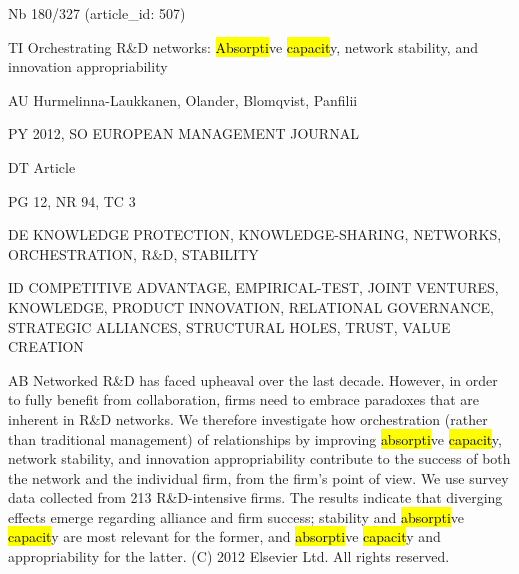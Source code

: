 \documentclass[a4paper]{article}
\begin{document}
\vspace*{-2cm}
Nb \tabto{0cm}180/327 (article\_id: 507)\par
TI \tabto{0cm}Orchestrating R\&D networks: \hl{Absorpti}ve \hl{capacit}y, network stability, and innovation appropriability\par
AU \tabto{0cm}Hurmelinna-Laukkanen, Olander, Blomqvist, Panfilii\par
PY \tabto{0cm}2012, SO EUROPEAN MANAGEMENT JOURNAL\par
DT \tabto{0cm}Article\par
PG \tabto{0cm}12, NR 94, TC 3\par
DE \tabto{0cm}KNOWLEDGE PROTECTION, KNOWLEDGE-SHARING, NETWORKS, ORCHESTRATION, R\&D, STABILITY\par
ID \tabto{0cm}COMPETITIVE ADVANTAGE, EMPIRICAL-TEST, JOINT VENTURES, KNOWLEDGE, PRODUCT INNOVATION, RELATIONAL GOVERNANCE, STRATEGIC ALLIANCES, STRUCTURAL HOLES, TRUST, VALUE CREATION\par
AB \tabto{0cm}Networked R\&D has faced upheaval over the last decade. However, in order to fully benefit from collaboration, firms need to embrace paradoxes that are inherent in R\&D networks. We therefore investigate how orchestration (rather than traditional management) of relationships by improving \hl{absorpti}ve \hl{capacit}y, network stability, and innovation appropriability contribute to the success of both the network and the individual firm, from the firm's point of view. We use survey data collected from 213 R\&D-intensive firms. The results indicate that diverging effects emerge regarding alliance and firm success; stability and \hl{absorpti}ve \hl{capacit}y are most relevant for the former, and \hl{absorpti}ve \hl{capacit}y and appropriability for the latter. (C) 2012 Elsevier Ltd. All rights reserved.\par
\clearpage
\end{document}
